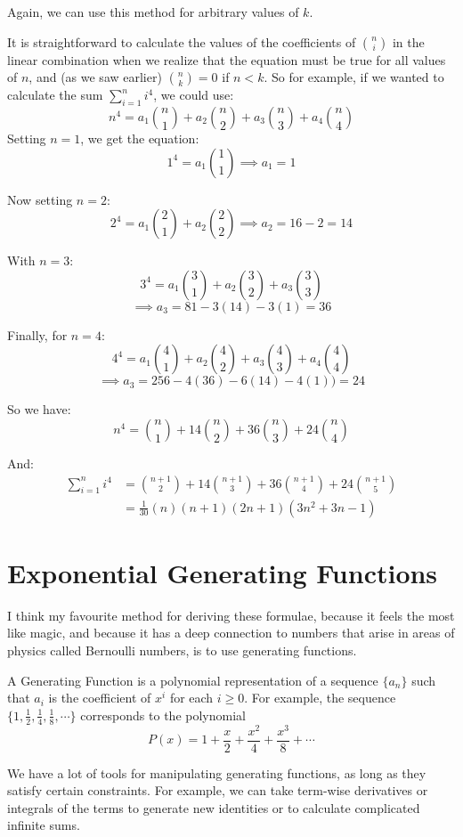 \documentclass{article}
\begin{document}
Again, we can use this method for arbitrary values of $k$.

It is straightforward to calculate the values of the coefficients of $\binom{n}{i}$ in
the linear combination when we realize that the equation must be true for all values of
$n$, and (as we saw earlier) $\binom{n}{k} = 0$ if $n<k$. So for example, if we wanted to 
calculate the sum $\sum_{i=1}^{n} i^4$, we could use:
\[ n^4 = a_1\binom{n}{1} + a_2\binom{n}{2} + a_3 \binom{n}{3} + a_4 \binom{n}{4} \]
Setting $n=1$, we get the equation:
\[ 1^4 = a_1\binom{1}{1} \implies a_1 = 1 \]

Now setting $n=2$:
\[ 2^4 = a_1\binom{2}{1} + a_2\binom{2}{2} \implies a_2 = 16-2 = 14 \]

With $n=3$:
\[ 3^4 = a_1\binom{3}{1} + a_2\binom{3}{2} + a_3\binom{3}{3}\]
\[\implies a_3 = 81 -3(14) - 3(1)  = 36 \]

Finally, for $n=4$:
\[ 4^4 = a_1\binom{4}{1} + a_2\binom{4}{2} + a_3\binom{4}{3} + a_4\binom{4}{4}\]
\[\implies a_3 = 256 -4(36) - 6(14) - 4(1))  = 24\]

So we have:
\[ n^4 = \binom{n}{1} + 14\binom{n}{2} + 36 \binom{n}{3} + 24 \binom{n}{4} \]

And:
\begin{align*}
	\sum_{i=1}^{n} i^4 &= \binom{n+1}{2} + 14\binom{n+1}{3} + 36 \binom{n+1}{4}
	                      + 24 \binom{n+1}{5} \\
			   &= \frac{1}{30} (n)(n + 1)(2n + 1)(3n^2 +3n - 1)
\end{align*}

\section{Exponential Generating Functions}

I think my favourite method for deriving these formulae, because it feels the most like
magic, and because it has a deep connection to numbers that arise in areas of
physics called Bernoulli numbers, is to use generating functions.

A Generating Function is a polynomial representation of a sequence $\{a_n\}$ such that
$a_i$ is the coefficient of $x^i$ for each $i \geq 0$. For example, the sequence 
$\{1, \frac{1}{2}, \frac{1}{4}, \frac{1}{8}, \cdots \}$ corresponds to the polynomial
\[ P(x) = 1 + \frac{x}{2} + \frac{x^2}{4} + \frac{x^3}{8} + \cdots \]

We have a lot of tools for manipulating generating functions, as long as they satisfy
certain constraints. For example, we can take term-wise derivatives or integrals of
the terms to generate new identities or to calculate complicated infinite sums.
\end{document}
